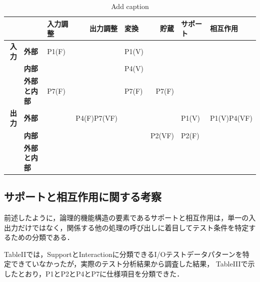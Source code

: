 \begin{table}[htbp]
  \centering
  \caption{Add caption}
    \begin{tabular}{|r|p{4em}|l|r|l|r|l|l|}
    \hline
          & \multicolumn{1}{l|}{} & \multicolumn{1}{p{4em}|}{\textbf{入力調整}} & \multicolumn{1}{p{4em}|}{\textbf{出力調整}} & \multicolumn{1}{p{4em}|}{\textbf{変換}} & \multicolumn{1}{p{4em}|}{\textbf{貯蔵}} & \multicolumn{1}{p{2em}|}{\textbf{サポート}} & \multicolumn{1}{p{1.915em}|}{\textbf{相互作用}} \bigstrut\\
    \hline
    \multicolumn{1}{|p{1.5em}|}{\textbf{入力}} & \textbf{外部} & \multicolumn{1}{p{4em}|}{P1(F)} &       & \multicolumn{1}{p{4em}|}{P1(V)} &       &       &  \bigstrut\\
\cline{2-8}          & \textbf{内部} &       &       & \multicolumn{1}{p{4em}|}{P4(V)} &       &       &  \bigstrut\\
\cline{2-8}          & \textbf{外部と内部} & \multicolumn{1}{p{4em}|}{P7(F)} &       & \multicolumn{1}{p{4em}|}{P7(F)} & \multicolumn{1}{p{4em}|}{P7(F)} &       &  \bigstrut\\
    \hline
    \multicolumn{1}{|p{1.5em}|}{\textbf{出力}} & \textbf{外部} &       & \multicolumn{1}{p{4em}|}{P4(F)P7(VF)} &       &       & \multicolumn{1}{p{2em}|}{P1(V)} & \multicolumn{1}{p{1.915em}|}{P1(V)P4(VF)} \bigstrut\\
\cline{2-8}          & \textbf{内部} &       &       &       & \multicolumn{1}{p{4em}|}{P2(VF)} & \multicolumn{1}{p{2em}|}{P2(F)} &  \bigstrut\\
\cline{2-5}\cline{8-8}          & \textbf{外部と内部} &       &       &       &       &       &  \bigstrut\\
    \hline
    \end{tabular}%
  \label{tab:addlabel-3}%
\end{table}%


\subsection{サポートと相互作用に関する考察}
前述したように，論理的機能構造の要素であるサポートと相互作用は，単一の入出力だけではなく，関係する他の処理の呼び出しに着目してテスト条件を特定するための分類である．

TableIIでは，SupportとInteractionに分類できるI/Oテストデータパターンを特定できていなかったが，実際のテスト分析結果から調査した結果，
TableIIIで示したとおり，P1とP2とP4とP7に仕様項目を分類できた．

